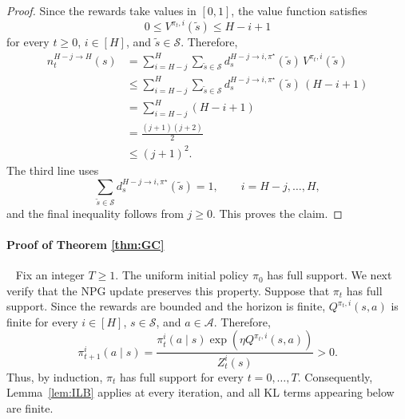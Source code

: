 \documentclass[11pt]{article}
\begin{document}
\begin{proof}
Since the rewards take values in $[0,1]$, the value function satisfies
\[
0
\le
V^{\pi_t,i}(\tilde s)
\le
H-i+1
\]
for every $t\ge0$, $i\in[H]$, and $\tilde s\in\mathcal S$. Therefore,
\begin{align*}
n_t^{H-j\to H}(s)
&=
\sum_{i=H-j}^{H}
\sum_{\tilde s\in\mathcal S}
d_s^{H-j\to i,\pi^\star}(\tilde s)\,
V^{\pi_t,i}(\tilde s)\\
&\le
\sum_{i=H-j}^{H}
\sum_{\tilde s\in\mathcal S}
d_s^{H-j\to i,\pi^\star}(\tilde s)\,
(H-i+1)\\
&=
\sum_{i=H-j}^{H}(H-i+1)\\
&=
\frac{(j+1)(j+2)}{2}\\
&\le
(j+1)^2.
\end{align*}
The third line uses
\[
\sum_{\tilde s\in\mathcal S}
d_s^{H-j\to i,\pi^\star}(\tilde s)
=
1,
\qquad i=H-j,\ldots,H,
\]
and the final inequality follows from $j\ge0$. This proves the claim.
\end{proof}

\paragraph{{Proof of Theorem \ref{thm:GC}}}~\newline 
Fix an integer $T\ge1$. The uniform initial policy $\pi_0$ has full
support. We next verify that the NPG update preserves this property.
Suppose that $\pi_t$ has full support. Since the rewards are bounded
and the horizon is finite, $Q^{\pi_t,i}(s,a)$ is finite for every
$i\in[H]$, $s\in\mathcal S$, and $a\in\mathcal A$. Therefore,
\[
\pi_{t+1}^i(a\mid s)
=
\frac{
\pi_t^i(a\mid s)
\exp\!\left(\eta Q^{\pi_t,i}(s,a)\right)
}{
Z_t^i(s)
}
>
0.
\]
Thus, by induction, $\pi_t$ has full support for every
$t=0,\ldots,T$. Consequently, Lemma~\ref{lem:ILB} applies at every
iteration, and all KL terms appearing below are finite.
\end{document}
